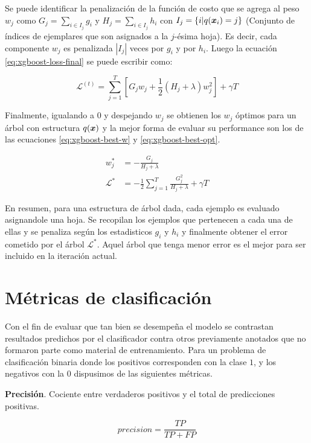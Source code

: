 Se puede identificar la penalización de la función de costo que se agrega al
peso $w_j$ como $G_{j} = \sum_{i \in I_j} g_i$ y $H_j = \sum_{i \in I_j} h_i$
con $I_j = \{i | q(\boldsymbol{x}_i) = j\}$ (Conjunto de índices de ejemplares que son
asignados a la $j$-ésima hoja). Es decir, cada componente $w_j$ es penalizada
$|I_{j}|$ veces por $g_i$ y por $h_i$. Luego la ecuación
\ref{eq:xgboost-loss-final} se puede escribir como:

\begin{equation}
    \mathcal{L}^{(t)} = \sum_{j = 1}^{T}[G_j w_j + \frac{1}{2} (H_j + \lambda)w_j^2] + \gamma T
\end{equation}

Finalmente, igualando a $0$ y despejando $w_j$ se obtienen los $w_j$ óptimos para
un árbol con estructura $q(\boldsymbol{x})$ y la mejor forma de evaluar su performance
son los de las ecuaciones \ref{eq:xgboost-best-w} y \ref{eq:xgboost-best-opt}.

\begin{align}
    w_{j}^{*} &= - \frac{G_j}{H_j + \lambda} \label{eq:xgboost-best-w}\\
    \mathcal{L}^{*} &= -\frac{1}{2} \sum_{j=1}^{T} \frac{G_{j}^{2}}{H_j + \lambda} + \gamma T \label{eq:xgboost-best-opt}
\end{align}

En resumen, para una estructura de árbol dada, cada ejemplo es evaluado
asignandole una hoja. Se recopilan los ejemplos que pertenecen a cada una de
ellas y se penaliza según los estadisticos $g_i$ y $h_i$ y finalmente obtener el
error cometido por el árbol $\mathcal{L^{*}}$. Aquel árbol que tenga menor error
es el mejor para ser incluido en la iteración actual.

\section{Métricas de clasificación}

Con el fin de evaluar que tan bien se desempeña el modelo se contrastan
resultados predichos por el clasificador contra otros previamente anotados que
no formaron parte como material de entrenamiento. Para un problema de
clasificación binaria donde los positivos corresponden con la clase $1$, y los
negativos con la $0$ dispusimos de las siguientes métricas.

\textbf{Precisión}. Cociente entre verdaderos positivos y el total de
predicciones positivas. 

\begin{equation}
    precision = \frac{TP}{TP + FP}
\end{equation}

